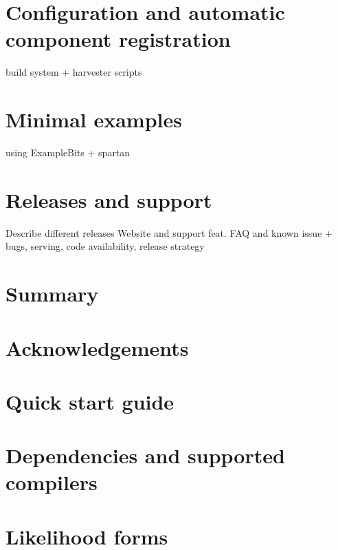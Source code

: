 \documentclass[11pt,a4paper]{article}
\begin{document}
\section{Configuration and automatic component registration}
build system + harvester scripts

\section{Minimal examples}
using ExampleBits + spartan

\section{Releases and support}
Describe different releases 
Website and support feat. FAQ and known issue + bugs, serving, code availability, release strategy

\section{Summary}

\section{Acknowledgements}

\appendix
\section{Quick start guide}
\section{Dependencies and supported compilers}
\section{Likelihood forms}
\end{document}
